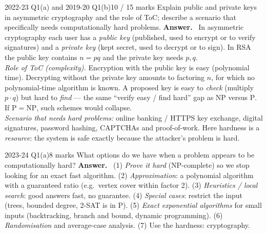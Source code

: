 \documentclass[10.5pt,a4paper]{article}
\newcommand{\ansh}[1]{\textbf{\color{exborder}#1}\ }
\newcommand{\NP}{\mathrm{NP}}
\renewcommand{\P}{\mathrm{P}}
\begin{document}
\begin{examq}{2022-23 Q1(a) and 2019-20 Q1(b)}{10 / 15 marks}
Explain public and private keys in asymmetric cryptography and the role of ToC; describe a scenario that specifically needs computationally
hard problems.
\tcblower
\ansh{Answer.} In asymmetric cryptography each user has a \emph{public key} (published, used to encrypt or to verify signatures) and a
\emph{private key} (kept secret, used to decrypt or to sign). In RSA the public key contains $n=pq$ and the private key needs $p,q$.\\
\emph{Role of ToC (complexity).} Encryption with the public key is easy (polynomial time). Decrypting without the private key amounts to
factoring $n$, for which no polynomial-time algorithm is known. A proposed key is easy to \emph{check} (multiply $p\cdot q$) but hard to
\emph{find} --- the same ``verify easy / find hard'' gap as $\NP$ versus $\P$. If $\P=\NP$, such schemes would collapse.\\
\emph{Scenario that needs hard problems:} online banking / HTTPS key exchange, digital signatures, password hashing, CAPTCHAs and
proof-of-work. Here hardness is a \emph{resource}: the system is safe exactly because the attacker's problem is hard.
\end{examq}

\begin{examq}{2023-24 Q1(a)}{8 marks}
What options do we have when a problem appears to be computationally hard?
\tcblower
\ansh{Answer.} (1) \emph{Prove it hard} (NP-complete) so we stop looking for an exact fast algorithm. (2) \emph{Approximation}: a
polynomial algorithm with a guaranteed ratio (e.g.\ vertex cover within factor 2). (3) \emph{Heuristics / local search}: good answers fast,
no guarantee. (4) \emph{Special cases}: restrict the input (trees, bounded degree, 2-SAT is in $\P$). (5) \emph{Exact exponential algorithms}
for small inputs (backtracking, branch and bound, dynamic programming). (6) \emph{Randomisation} and average-case analysis. (7) Use the
hardness: cryptography.
\end{examq}

\end{document}
